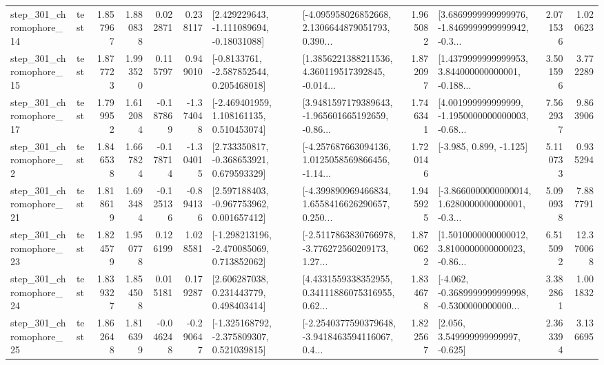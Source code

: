 \begin{tabular}{llrrrrllrlrr}
  step\_301\_chromophore\_14 &      test &      1.857967 &    1.880838 &      0.022871 &  0.238117 &    [2.429229643, -1.111089694, -0.18031088] &  [-4.095958026852668, 2.1306644879051793, 0.390... &       1.965082 &  [3.6869999999999976, -1.8469999999999942, -0.3... &            2.071536 &          1.020623 \\
  step\_301\_chromophore\_15 &      test &      1.877723 &    1.993520 &      0.115797 &  0.949010 &     [-0.8133761, -2.587852544, 0.205468018] &  [1.3856221388211536, 4.360119517392845, -0.014... &       1.872097 &  [1.4379999999999953, 3.844000000000001, -0.188... &            3.501596 &          3.772289 \\
  step\_301\_chromophore\_17 &      test &      1.799952 &    1.612084 &     -0.187869 & -1.374048 &    [-2.469401959, 1.108161135, 0.510453074] &  [3.9481597179389643, -1.965601665192659, -0.86... &       1.746341 &  [4.001999999999999, -1.1950000000000003, -0.68... &            7.562937 &          9.863906 \\
   step\_301\_chromophore\_2 &      test &      1.846538 &    1.667824 &     -0.178714 & -1.304015 &    [2.733350817, -0.368653921, 0.679593329] &  [-4.257687663094136, 1.0125058569866456, -1.14... &       1.720146 &                            [-3.985, 0.899, -1.125] &            5.110733 &          0.935294 \\
  step\_301\_chromophore\_21 &      test &      1.818619 &    1.693484 &     -0.125136 & -0.894136 &    [2.597188403, -0.967753962, 0.001657412] &  [-4.399890969466834, 1.6558416626290657, 0.250... &       1.945925 &  [-3.8660000000000014, 1.6280000000000001, -0.3... &            5.090938 &          7.887791 \\
  step\_301\_chromophore\_23 &      test &      1.824579 &    1.950778 &      0.126199 &  1.028581 &   [-1.298213196, -2.470085069, 0.713852062] &  [-2.5117863830766978, -3.776272560209173, 1.27... &       1.870622 &  [1.5010000000000012, 3.8100000000000023, -0.86... &            6.515092 &         12.370068 \\
  step\_301\_chromophore\_24 &      test &      1.839327 &    1.854508 &      0.015181 &  0.179287 &     [2.606287038, 0.231443779, 0.498403414] &  [4.4331559338352955, 0.34111886075316955, 0.62... &       1.834678 &  [-4.062, -0.3689999999999998, -0.5300000000000... &            3.382861 &          1.001832 \\
  step\_301\_chromophore\_25 &      test &      1.862648 &    1.816399 &     -0.046248 & -0.290647 &   [-1.325168792, -2.375809307, 0.521039815] &  [-2.2540377590379648, -3.9418463594116067, 0.4... &       1.822567 &                 [2.056, 3.549999999999997, -0.625] &            2.363394 &          3.136695 \\

\end{tabular}
